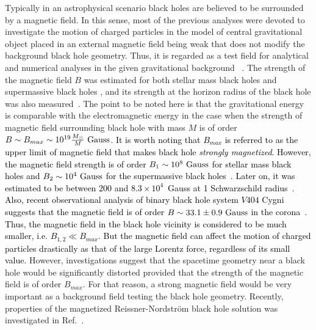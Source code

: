 \documentclass[showpacs,twocolumn,superscriptaddress]{revtex4}
\begin{document}
Typically in an astrophysical scenario black holes are believed to be surrounded by a magnetic field. In this sense, most of the previous analyses were devoted to investigate the motion of charged particles in the model of central gravitational object 
placed in an external magnetic field being weak that does not modify the background black hole geometry. 
Thus, it is regarded as a test field for analytical and numerical analyses in the given gravitational background~
\cite[see, e.g.][]{Frolov10,Aliev02,Abdujabbarov10,Shaymatov14,Shaymatov18a,Kolos15,Stuchlik16,Tursunov16}.
The strength of the magnetic field $B$ was estimated for both stellar mass black holes and supermassive black holes \cite{Piotrovich10},
and its strength at the horizon radius of the black hole
was also measured~\cite{Eatough13,Shannon13}. 
The point to be noted here is that the gravitational energy is comparable with the electromagnetic energy in the case when the strength of magnetic field surrounding black hole with mass $M$ is of order $ B\sim B_{max} \sim 10^{19}\frac{M_\odot}{M}~ \rm{Gauss}$. \textcolor{black}{It is worth noting that $B_{max}$ is referred to as the upper limit of magnetic field that makes black hole \textit{strongly magnetized}.  However, the magnetic field strength  is of order $B_1\sim 10^{8}~\rm{Gauss}$ for stellar mass black holes and $B_2\sim 10^{4}~\rm{Gauss}$ for the supermassive black holes~\cite{Piotrovich10}. Later on, it was estimated to be between $200$ and $8.3 \times 10^{4}$~\rm{Gauss} at 1 Schwarzschild radius~\cite{Baczko16}. Also, recent observational analysis of binary black  hole  system $V404$  Cygni suggests that the magnetic field is of order $B\sim 33.1 \pm 0.9~\rm{Gauss}$ in the
corona~\cite{Dallilar2018}. Thus, the magnetic field
in the black hole vicinity is considered to be much smaller, i.e. $B_{1,2}\ll B_{max}$. But the magnetic field can affect the motion of charged
particles drastically as that of the large Lorentz force, regardless of its small value.}  However, investigations suggest that the spacetime geometry near a black hole would be significantly distorted provided that the strength of the magnetic field is of order $B_{max}$. For that reason, a strong magnetic field would be very important as a background field testing the black hole geometry. Recently, properties of the magnetized Reissner-Nordstr\"{o}m black hole solution was investigated in Ref.~\cite{Gibbons13}.
\end{document}
